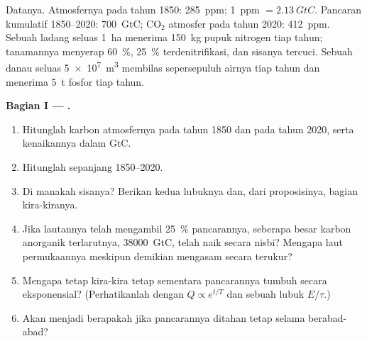\begin{problem}
\label{pb:b2:biogeochemical-cycles:1}
Datanya. Atmosfernya pada tahun 1850: \qty{285}{ppm}; \qty{1}{ppm} $=
\qty{2.13}{GtC}$. Pancaran kumulatif 1850--2020: \qty{700}{GtC};
$\mathrm{CO_2}$ atmosfer pada tahun 2020: \qty{412}{ppm}. Sebuah ladang
seluas \qty{1}{ha} menerima \qty{150}{kg} pupuk nitrogen tiap tahun;
tanamannya menyerap \qty{60}{\%}, \qty{25}{\%} terdenitrifikasi, dan
sisanya tercuci. Sebuah danau seluas \qty{5e7}{m^3} membilas
sepersepuluh airnya tiap tahun dan menerima \qty{5}{t} fosfor tiap tahun.

\medskip
\noindent\textbf{Bagian I --- .}
\begin{enumerate}
  \item Hitunglah karbon atmosfernya pada tahun 1850 dan pada tahun
        2020, serta kenaikannya dalam GtC.
  \item Hitunglah  sepanjang 1850--2020.
  \item Di manakah sisanya? Berikan kedua lubuknya dan, dari
        proposisinya, bagian kira-kiranya.
  \item Jika lautannya telah mengambil \qty{25}{\%} pancarannya,
        seberapa besar karbon anorganik terlarutnya, \qty{38000}{GtC},
        telah naik secara nisbi? Mengapa laut permukaannya meskipun
        demikian mengasam secara terukur?
  \item Mengapa  tetap kira-kira tetap sementara
        pancarannya tumbuh secara eksponensial? (Perhatikanlah  dengan $Q \propto e^{t/T}$ dan sebuah lubuk $E/\tau$.)
  \item Akan menjadi berapakah  jika pancarannya
        ditahan tetap selama berabad-abad?
\end{enumerate}


\end{problem}
